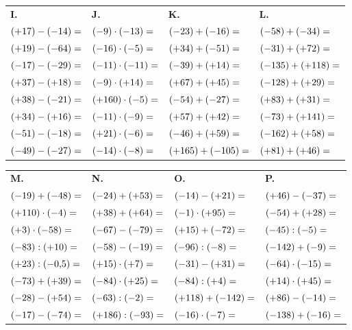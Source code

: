 {\bigskip
\begin{tabularx}{\linewidth}{*{4}{X}}
\textbf{I.} & \textbf{J.} & \textbf{K.} & \textbf{L.} \\
$(+17)-(-14)= \dotfill$ & $(-9)\cdot(-13)= \dotfill$ & $(-23)+(-16)= \dotfill$ & $(-58)+(-34)= \dotfill$ \\
$(+19)-(-64)= \dotfill$ & $(-16)\cdot(-5)= \dotfill$ & $(+34)+(-51)= \dotfill$ & $(-31)+(+72)= \dotfill$ \\
$(-17)-(-29)= \dotfill$ & $(-11)\cdot(-11)= \dotfill$ & $(-39)+(+14)= \dotfill$ & $(-135)+(+118)= \dotfill$ \\
$(+37)-(+18)= \dotfill$ & $(-9)\cdot(+14)= \dotfill$ & $(+67)+(+45)= \dotfill$ & $(-128)+(+29)= \dotfill$ \\
$(+38)-(-21)= \dotfill$ & $(+160)\cdot(-5)= \dotfill$ & $(-54)+(-27)= \dotfill$ & $(+83)+(+31)= \dotfill$ \\
$(+34)-(+16)= \dotfill$ & $(-11)\cdot(-9)= \dotfill$ & $(+57)+(+42)= \dotfill$ & $(-73)+(+141)= \dotfill$ \\
$(-51)-(-18)= \dotfill$ & $(+21)\cdot(-6)= \dotfill$ & $(-46)+(+59)= \dotfill$ & $(-162)+(+58)= \dotfill$ \\
$(-49)-(-27)= \dotfill$ & $(-14)\cdot(-8)= \dotfill$ & $(+165)+(-105)= \dotfill$ & $(+81)+(+46)= \dotfill$ \\
\end{tabularx}

\bigskip
\begin{tabularx}{\linewidth}{*{4}{X}}
\textbf{M.} & \textbf{N.} & \textbf{O.} & \textbf{P.} \\
$(-19)+(-48)= \dotfill$ & $(-24)+(+53)= \dotfill$ & $(-14)-(+21)= \dotfill$ & $(+46)-(-37)= \dotfill$ \\
$(+110)\cdot(-4)= \dotfill$ & $(+38)+(+64)= \dotfill$ & $(-1)\cdot(+95)= \dotfill$ & $(-54)+(+28)= \dotfill$ \\
$(+3)\cdot(-58)= \dotfill$ & $(-67)-(-79)= \dotfill$ & $(+15)+(-72)= \dotfill$ & $(-45):(-5)= \dotfill$ \\
$(-83):(+10)= \dotfill$ & $(-58)-(-19)= \dotfill$ & $(-96):(-8)= \dotfill$ & $(-142)+(-9)= \dotfill$ \\
$(+23):(-0{,}5)= \dotfill$ & $(+15)\cdot(+7)= \dotfill$ & $(-31)-(+31)= \dotfill$ & $(-64)\cdot(-15)= \dotfill$ \\
$(-73)+(+39)= \dotfill$ & $(-84)\cdot(+25)= \dotfill$ & $(-84):(+4)= \dotfill$ & $(+14)\cdot(+45)= \dotfill$ \\
$(-28)-(+54)= \dotfill$ & $(-63):(-2)= \dotfill$ & $(+118)+(-142)= \dotfill$ & $(+86)-(-14)= \dotfill$ \\
$(-17)-(-74)= \dotfill$ & $(+186):(-93)= \dotfill$ & $(-16)\cdot(-7)= \dotfill$ & $(-138)+(-16)= \dotfill$ \\
\end{tabularx}}